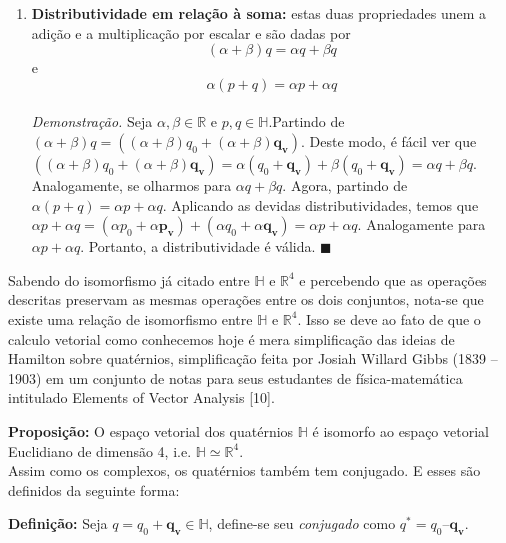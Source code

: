 \documentclass[a4paper,12pt]{article}
\begin{document}
\begin{itemize}
\begin{enumerate}
			\\ \item \textbf{Distributividade em relação à soma:} estas duas propriedades unem a adição e a multiplicação por escalar e são dadas por
			\begin{equation*}
			(\alpha+\beta)q=\alpha q + \beta q
			\end{equation*}
			e 
			\begin{equation*}
			\alpha(p+q)=\alpha p + \alpha q	
			\end{equation*}
			\\ \textit{Demonstração.} Seja $\alpha,\beta \in \mathbb{R}$ e $p,q \in \mathbb{H}$.Partindo de $(\alpha + \beta)q=((\alpha + \beta)q_0 + (\alpha + \beta)\mathbf{q_v})$. Deste modo, é fácil ver que $((\alpha + \beta)q_0 + (\alpha + \beta)\mathbf{q_v})=\alpha(q_0+\mathbf{q_v})+\beta(q_0+\mathbf{q_v})=\alpha q+\beta q$. Analogamente, se olharmos para $\alpha q+\beta q$. Agora, partindo de $\alpha(p+q)=\alpha p+\alpha q$. Aplicando as devidas distributividades, temos que $\alpha p+\alpha q=(\alpha p_0+\alpha\mathbf{p_v})+(\alpha q_0+\alpha\mathbf{q_v})=\alpha p+\alpha q$. Analogamente para $\alpha p+\alpha q$. Portanto, a distributividade é válida. \hfill$\blacksquare$ 
		\end{enumerate}
	\end{itemize}
	
	Sabendo do isomorfismo já citado entre $\mathbb{H}$ e $\mathbb{R}^4$ e percebendo que as operações descritas preservam as mesmas operações entre os dois conjuntos, nota-se que existe uma relação de isomorfismo entre $\mathbb{H}$ e $\mathbb{R}^4$. Isso se deve ao fato de que o calculo vetorial como conhecemos hoje é mera simplificação das ideias de Hamilton sobre quatérnios, simplificação feita por Josiah Willard Gibbs (1839 – 1903) em um conjunto de notas para seus estudantes de física-matemática intitulado Elements of Vector Analysis [10].
	
	\textbf{Proposição:} O espaço vetorial dos quatérnios $\mathbb{H}$ é isomorfo ao espaço vetorial Euclidiano de dimensão 4, i.e. $\mathbb{H} \simeq \mathbb{R}^4$.
	\\
	
	Assim como os complexos, os quatérnios também tem conjugado. E esses são definidos da seguinte forma:
	
	\textbf{Definição:} Seja $q = q_0 + \mathbf{q_v} \in \mathbb{H}$, define-se seu \textit{conjugado} como $q^* = q_0 – \mathbf{q_v}$.
	\\
	
\end{document}
